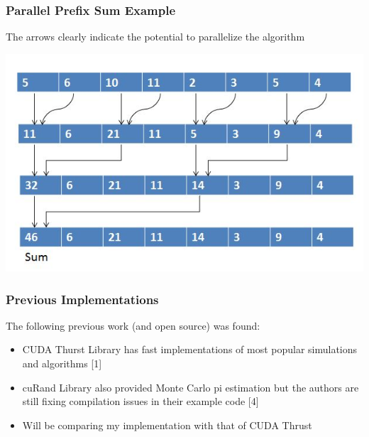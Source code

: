 \documentclass[mathserif]{beamer}
\begin{document}
\begin{frame}                                                                                                                                                                          
\frametitle{Parallel Prefix Sum Example}
The arrows clearly indicate the potential to parallelize the algorithm
\begin{center}
\includegraphics[scale=0.5]{parallel_sum.JPG}
\end{center}
\end{frame}              
\begin{frame}                                                                                                                                                                          
\frametitle{Previous Implementations}
The following previous work (and open source) was found:
\begin{itemize}
\item CUDA Thurst Library has fast implementations of most popular simulations and algorithms [1]
\item cuRand Library also provided Monte Carlo pi estimation but the authors are still fixing compilation issues in their example code [4]
\item Will be comparing my implementation with that of CUDA Thrust 
\end{itemize}
\end{frame}             
\end{document}
